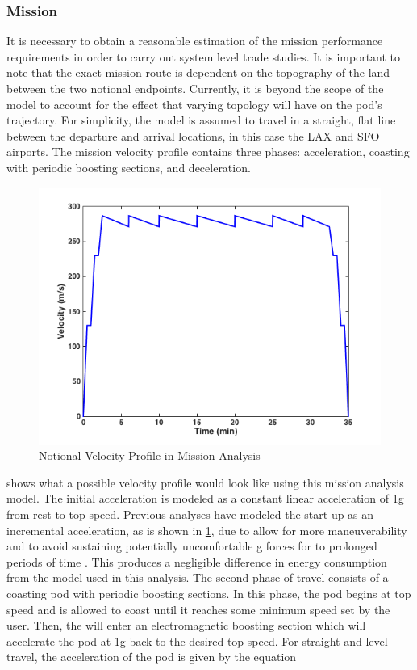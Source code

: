 \subsubsection{Mission}
It is necessary to obtain a reasonable estimation of the mission performance requirements in order to carry out system level trade studies. It is important to note that the exact mission route is dependent on the topography of the land between the two notional endpoints. Currently, it is beyond the scope of the model to account for the effect that varying topology will have on the pod’s trajectory. For simplicity, the model is assumed to travel in a straight, flat line between the departure and arrival locations, in this case the LAX and SFO airports. The mission velocity profile contains three phases: acceleration, coasting with periodic boosting sections, and deceleration. 
\begin{figure}
	\centering
	\includegraphics{../images/mission_profile.png}
	\caption{Notional Velocity Profile in Mission Analysis}
	\label{fig:mission_profile}
\end{figure}
 shows what a possible velocity profile would look like using this mission analysis model. The initial acceleration is modeled as a constant linear acceleration of 1g from rest to top speed. Previous analyses have modeled the start up as an incremental acceleration, as is shown in \cref{fig:mission_profile}, due to allow for more maneuverability and to avoid sustaining potentially uncomfortable g forces for to prolonged periods of time \cite{Chin}. This produces a negligible difference in energy consumption from the model used in this analysis. The second phase of travel consists of a coasting pod with periodic boosting sections. In this phase, the pod begins at top speed and is allowed to coast until it reaches some minimum speed set by the user. Then, the will enter an electromagnetic boosting section which will accelerate the pod at 1g back to the desired top speed. For straight and level travel, the acceleration of the pod is given by the equation 
